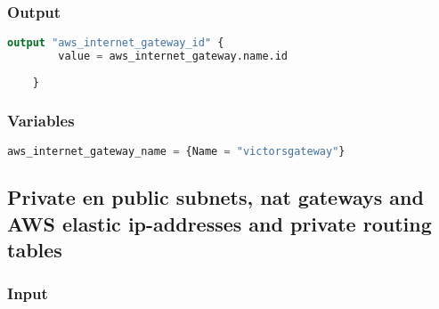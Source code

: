 \subsubsection{
{Output}}

\begin{lstlisting}[language=terraform]
    output "aws_internet_gateway_id" {
        value = aws_internet_gateway.name.id
      
    }
\end{lstlisting}

\subsubsection{
{Variables}}

\begin{lstlisting}[language=terraform]
    aws_internet_gateway_name = {Name = "victorsgateway"}     
\end{lstlisting}

\subsection{
{Private en public subnets, nat gateways and AWS elastic ip-addresses and private routing tables}}
\label{sec:Private en publieke subnets, nat gateways and AWS elastic ip-adressen en private route tabellen}

\subsubsection{
{Input}}

